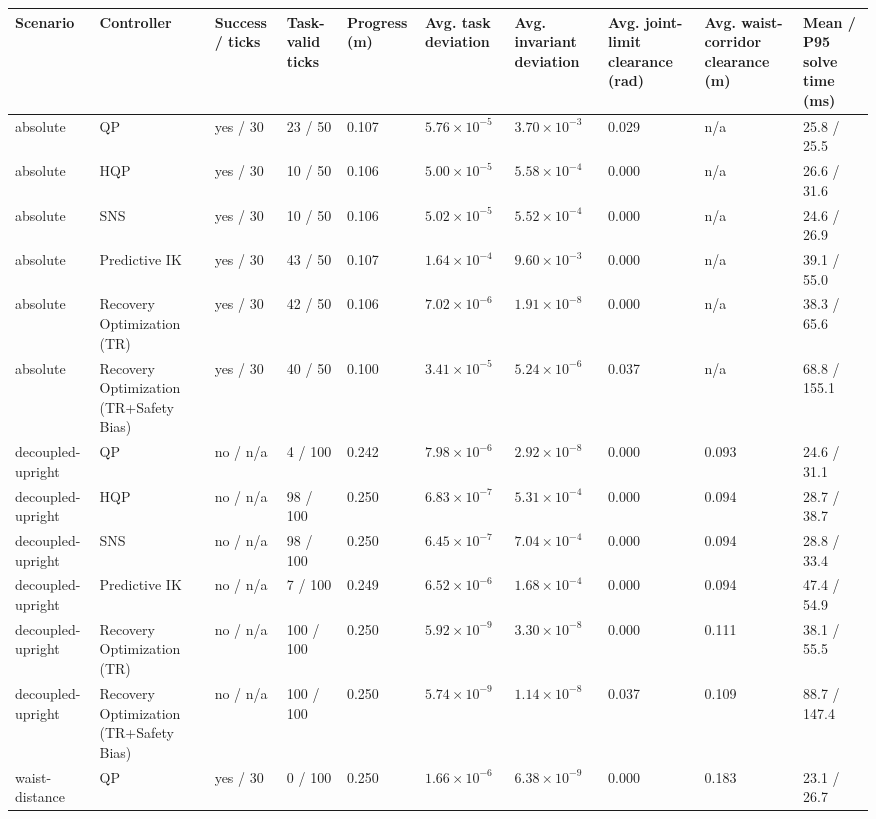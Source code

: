 \begin{tabular}{llllllllll}
\toprule
Scenario & Controller & Success / ticks & Task-valid ticks & Progress (m) & Avg. task deviation & Avg. invariant deviation & Avg. joint-limit clearance (rad) & Avg. waist-corridor clearance (m) & Mean / P95 solve time (ms) \\
\midrule
absolute & QP & yes / 30 & 23 / 50 & 0.107 & $5.76\times 10^{-5}$ & $3.70\times 10^{-3}$ & 0.029 & n/a & 25.8 / 25.5 \\
absolute & HQP & yes / 30 & 10 / 50 & 0.106 & $5.00\times 10^{-5}$ & $5.58\times 10^{-4}$ & 0.000 & n/a & 26.6 / 31.6 \\
absolute & SNS & yes / 30 & 10 / 50 & 0.106 & $5.02\times 10^{-5}$ & $5.52\times 10^{-4}$ & 0.000 & n/a & 24.6 / 26.9 \\
absolute & Predictive IK & yes / 30 & 43 / 50 & 0.107 & $1.64\times 10^{-4}$ & $9.60\times 10^{-3}$ & 0.000 & n/a & 39.1 / 55.0 \\
absolute & Recovery Optimization (TR) & yes / 30 & 42 / 50 & 0.106 & $7.02\times 10^{-6}$ & $1.91\times 10^{-8}$ & 0.000 & n/a & 38.3 / 65.6 \\
absolute & Recovery Optimization (TR+Safety Bias) & yes / 30 & 40 / 50 & 0.100 & $3.41\times 10^{-5}$ & $5.24\times 10^{-6}$ & 0.037 & n/a & 68.8 / 155.1 \\
decoupled-upright & QP & no / n/a & 4 / 100 & 0.242 & $7.98\times 10^{-6}$ & $2.92\times 10^{-8}$ & 0.000 & 0.093 & 24.6 / 31.1 \\
decoupled-upright & HQP & no / n/a & 98 / 100 & 0.250 & $6.83\times 10^{-7}$ & $5.31\times 10^{-4}$ & 0.000 & 0.094 & 28.7 / 38.7 \\
decoupled-upright & SNS & no / n/a & 98 / 100 & 0.250 & $6.45\times 10^{-7}$ & $7.04\times 10^{-4}$ & 0.000 & 0.094 & 28.8 / 33.4 \\
decoupled-upright & Predictive IK & no / n/a & 7 / 100 & 0.249 & $6.52\times 10^{-6}$ & $1.68\times 10^{-4}$ & 0.000 & 0.094 & 47.4 / 54.9 \\
decoupled-upright & Recovery Optimization (TR) & no / n/a & 100 / 100 & 0.250 & $5.92\times 10^{-9}$ & $3.30\times 10^{-8}$ & 0.000 & 0.111 & 38.1 / 55.5 \\
decoupled-upright & Recovery Optimization (TR+Safety Bias) & no / n/a & 100 / 100 & 0.250 & $5.74\times 10^{-9}$ & $1.14\times 10^{-8}$ & 0.037 & 0.109 & 88.7 / 147.4 \\
waist-distance & QP & yes / 30 & 0 / 100 & 0.250 & $1.66\times 10^{-6}$ & $6.38\times 10^{-9}$ & 0.000 & 0.183 & 23.1 / 26.7 \\

\end{tabular}

